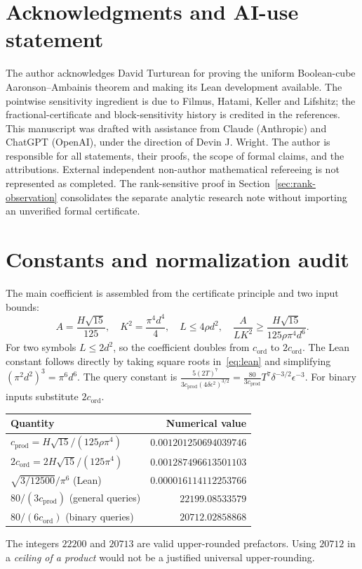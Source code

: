 \documentclass[11pt]{article}
\numberwithin{equation}{section}
\theoremstyle{remark}
\newcommand{\cprod}{c_{\mathrm{prod}}}
\newcommand{\cord}{c_{\mathrm{ord}}}
\begin{document}
\section*{Acknowledgments and AI-use statement}
The author acknowledges David Turturean for proving the uniform Boolean-cube Aaronson--Ambainis theorem and making its Lean development available. The pointwise sensitivity ingredient is due to Filmus, Hatami, Keller and Lifshitz; the fractional-certificate and block-sensitivity history is credited in the references. This manuscript was drafted with assistance from Claude (Anthropic) and ChatGPT (OpenAI), under the direction of Devin J. Wright. The author is responsible for all statements, their proofs, the scope of formal claims, and the attributions. External independent non-author mathematical refereeing is not represented as completed. The rank-sensitive proof in Section~\ref{sec:rank-observation} consolidates the separate analytic research note without importing an unverified formal certificate.

\appendix
\section{Constants and normalization audit}\label{app:constants}
The main coefficient is assembled from the certificate principle and two input bounds:
\[
 A=\frac{H\sqrt{15}}{125},\quad K^2=\frac{\pi^4d^4}{4},\quad
 L\le4\rho d^2,\quad \frac{A}{LK^2}\ge\frac{H\sqrt{15}}{125\rho\pi^4d^6}.
\]
For two symbols $L\le2d^2$, so the coefficient doubles from $\cord$ to $2\cord$. The Lean constant follows directly by taking square roots in~\eqref{eq:lean} and simplifying $(\pi^2d^2)^3=\pi^6d^6$.
The query constant is $\frac{5(2T)^7}{3\cprod(4\delta\epsilon^2)^{3/2}}=\frac{80}{3\cprod}T^7\delta^{-3/2}\epsilon^{-3}$. For binary inputs substitute $2\cord$.
\begin{center}
\begin{tabular}{@{}>{\raggedright\arraybackslash}p{.48\linewidth}r@{}}\toprule
Quantity & Numerical value\\\midrule
$\cprod=H\sqrt{15}/(125\rho\pi^4)$ & $0.001201250694039746$\\
$2\cord=2H\sqrt{15}/(125\pi^4)$ & $0.001287496613501103$\\
$\sqrt{3/12500}/\pi^6$ (Lean) & $0.000016114112253766$\\
$80/(3\cprod)$ (general queries) & $22199.08533579$\\
$80/(6\cord)$ (binary queries) & $20712.02858868$\\\bottomrule
\end{tabular}
\end{center}
The integers $22200$ and $20713$ are valid upper-rounded prefactors. Using $20712$ in a \emph{ceiling of a product} would not be a justified universal upper-rounding.
\end{document}
